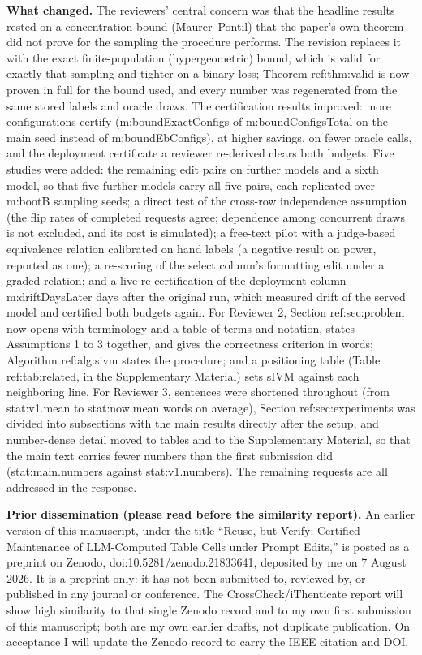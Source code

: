 \documentclass[10.5pt]{article}
\begin{document}
\textbf{What changed.} The reviewers' central concern was that the headline results rested on a concentration bound (Maurer--Pontil) that the paper's own theorem did not prove for the sampling the procedure performs. The revision replaces it with the exact finite-population (hypergeometric) bound, which is valid for exactly that sampling and tighter on a binary loss; Theorem {{ref:thm:valid}} is now proven in full for the bound used, and every number was regenerated from the same stored labels and oracle draws. The certification results improved: more configurations certify ({{m:boundExactConfigs}} of {{m:boundConfigsTotal}} on the main seed instead of {{m:boundEbConfigs}}), at higher savings, on fewer oracle calls, and the deployment certificate a reviewer re-derived clears both budgets. Five studies were added: the remaining edit pairs on further models and a sixth model, so that five further models carry all five pairs, each replicated over {{m:bootB}} sampling seeds; a direct test of the cross-row independence assumption (the flip rates of completed requests agree; dependence among concurrent draws is not excluded, and its cost is simulated); a free-text pilot with a judge-based equivalence relation calibrated on hand labels (a negative result on power, reported as one); a re-scoring of the select column's formatting edit under a graded relation; and a live re-certification of the deployment column {{m:driftDaysLater}} days after the original run, which measured drift of the served model and certified both budgets again. For Reviewer 2, Section {{ref:sec:problem}} now opens with terminology and a table of terms and notation, states Assumptions 1 to 3 together, and gives the correctness criterion in words; Algorithm {{ref:alg:sivm}} states the procedure; and a positioning table (Table {{ref:tab:related}}, in the Supplementary Material) sets sIVM against each neighboring line. For Reviewer 3, sentences were shortened throughout (from {{stat:v1.mean}} to {{stat:now.mean}} words on average), Section {{ref:sec:experiments}} was divided into subsections with the main results directly after the setup, and number-dense detail moved to tables and to the Supplementary Material, so that the main text carries fewer numbers than the first submission did ({{stat:main.numbers}} against {{stat:v1.numbers}}). The remaining requests are all addressed in the response.

\textbf{Prior dissemination (please read before the similarity report).} An earlier version of this manuscript, under the title ``Reuse, but Verify: Certified Maintenance of LLM-Computed Table Cells under Prompt Edits,'' is posted as a preprint on Zenodo, doi:10.5281/zenodo.21833641, deposited by me on 7 August 2026. It is a preprint only: it has not been submitted to, reviewed by, or published in any journal or conference. The CrossCheck/iThenticate report will show high similarity to that single Zenodo record and to my own first submission of this manuscript; both are my own earlier drafts, not duplicate publication. On acceptance I will update the Zenodo record to carry the IEEE citation and DOI.
\end{document}
